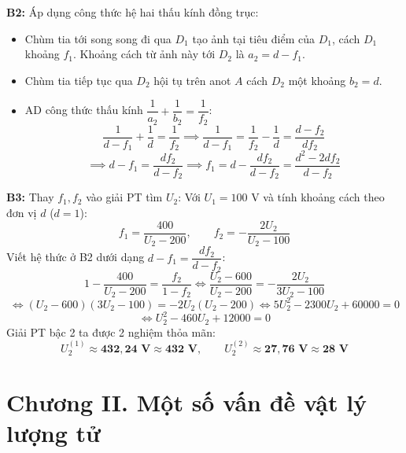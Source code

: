 \documentclass[11pt,a4paper]{article}
\renewcommand{\boldsymbol}[1]{\symbf{#1}}
\begin{document}
\textbf{B2:} Áp dụng công thức hệ hai thấu kính đồng trục:
\begin{itemize}[leftmargin=*, topsep=1pt, itemsep=1pt]
  \item Chùm tia tới song song đi qua $D_1$ tạo ảnh tại tiêu điểm của $D_1$, cách $D_1$ khoảng $f_1$. Khoảng cách từ ảnh này tới $D_2$ là $a_2 = d - f_1$.
  \item Chùm tia tiếp tục qua $D_2$ hội tụ trên anot $A$ cách $D_2$ một khoảng $b_2 = d$.
  \item AD công thức thấu kính $\dfrac{1}{a_2} + \dfrac{1}{b_2} = \dfrac{1}{f_2}$:
  \begin{equation*}
      \frac{1}{d - f_1} + \frac{1}{d} = \frac{1}{f_2} \implies \frac{1}{d - f_1} = \frac{1}{f_2} - \frac{1}{d} = \frac{d - f_2}{d f_2}
  \end{equation*}
  \begin{equation*}
      \implies d - f_1 = \frac{d f_2}{d - f_2} \implies f_1 = d - \frac{d f_2}{d - f_2} = \frac{d^2 - 2 d f_2}{d - f_2}
  \end{equation*}
\end{itemize}

\textbf{B3:} Thay $f_1, f_2$ vào giải PT tìm $U_2$:
Với $U_1=100\text{ V}$ và tính khoảng cách theo đơn vị $d$ ($d=1$):
\begin{equation*}
    f_1 = \frac{400}{U_2 - 200}, \qquad f_2 = -\frac{2U_2}{U_2 - 100}
\end{equation*}
Viết hệ thức ở B2 dưới dạng $d - f_1 = \dfrac{d f_2}{d - f_2}$:
\begin{equation*}
    1 - \frac{400}{U_2-200} = \frac{f_2}{1-f_2}
    \iff \frac{U_2-600}{U_2-200} = -\frac{2U_2}{3U_2-100}
\end{equation*}
\begin{equation*}
    \iff (U_2-600)(3U_2-100) = -2U_2(U_2-200)
    \iff 5U_2^2 - 2300U_2 + 60000 = 0
\end{equation*}
\begin{equation*}
    \iff U_2^2 - 460 U_2 + 12000 = 0
\end{equation*}
Giải PT bậc 2 ta được 2 nghiệm thỏa mãn:
\begin{equation*}
    U_2^{(1)} \approx \boldsymbol{432{,}24\text{ V}} \approx \boldsymbol{432\text{ V}}, \qquad U_2^{(2)} \approx \boldsymbol{27{,}76\text{ V}} \approx \boldsymbol{28\text{ V}}
\end{equation*}

\clearpage
\section*{Chương II. Một số vấn đề vật lý lượng tử}
\end{document}
